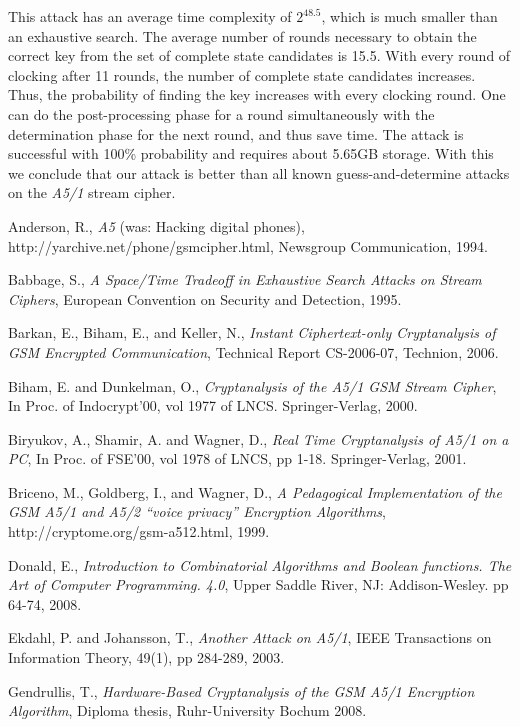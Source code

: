 \documentclass{llncs}
\begin{document}
This attack has an average time complexity of $2^{48.5}$, which is much smaller than an exhaustive search. The average number of rounds necessary to obtain the correct key from the set of complete state candidates is 15.5. With every round of clocking after 11 rounds, the number of complete state candidates increases. Thus, the probability of finding the key increases with every clocking round. One can do the post-processing phase for a round simultaneously with the determination phase for the next round, and thus save time. The attack is successful with 100\% probability and requires about 5.65GB storage. With this we conclude that our attack is better than all known guess-and-determine attacks on the \emph{A5/1} stream cipher.
\begin{thebibliography}{Ref}
\bibitem{[And]} Anderson, R., {\it A5} (was: Hacking digital phones), http://yarchive.net/phone/gsmcipher.html, Newsgroup Communication, 1994.

\bibitem{[Bab]} Babbage, S., {\it A Space/Time Tradeoff in Exhaustive Search Attacks on Stream Ciphers}, European Convention on Security and Detection, 1995.

\bibitem{[Bar]} {Barkan, E., Biham, E., and Keller, N.}, \textit{Instant Ciphertext-only Cryptanalysis of GSM Encrypted Communication}, Technical Report CS-2006-07, Technion, 2006.

\bibitem{[BD]} {Biham, E. and Dunkelman, O.}, {\it Cryptanalysis of the A5/1 GSM Stream Cipher}, In Proc. of Indocrypt'00, vol 1977 of LNCS. Springer-Verlag, 2000.

\bibitem{[Bir]} {Biryukov, A., Shamir, A. and Wagner, D.}, {\it Real Time Cryptanalysis of A5/1 on a PC}, In Proc. of FSE'00, vol 1978 of LNCS, pp 1-18. Springer-Verlag, 2001.

\bibitem{[Bri]} {Briceno, M., Goldberg, I., and Wagner, D.}, {\it A Pedagogical Implementation of the GSM A5/1 and A5/2 ``voice privacy'' Encryption Algorithms}, http://cryptome.org/gsm-a512.html, 1999.

\bibitem{[Donald]} {Donald, E.}, {\it Introduction to  Combinatorial Algorithms and Boolean functions. The Art of Computer Programming. 4.0}, Upper Saddle River, NJ: Addison-Wesley. pp 64-74, 2008.

\bibitem{[Ek]} {Ekdahl, P. and Johansson, T.}, {\it Another Attack on A5/1}, IEEE Transactions on Information Theory, 49(1), pp 284-289, 2003. 

\bibitem{[Gend]} {Gendrullis, T.}, {\it Hardware-Based Cryptanalysis of the GSM A5/1 Encryption Algorithm}, Diploma thesis, Ruhr-University Bochum 2008.


\end{thebibliography}
\end{document}
